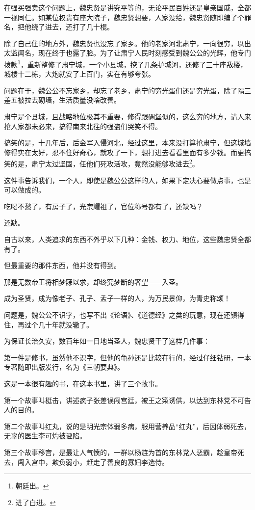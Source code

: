 \begin{multicols}{\theparacolNo}
在强买强卖这个问题上，魏忠贤是讲究平等的，无论平民百姓还是皇亲国戚，全都一视同仁。如某位权贵有座大院子，魏忠贤想要，人家没给，魏忠贤随即编了个罪名，把他绕了进去，还打了几十棍。

除了自己住的地方外，魏忠贤也没忘了家乡。他的老家河北肃宁，一向很穷，以出太监闻名，现在终于也露了脸。为了让肃宁人民时刻感受到魏公公的光辉，他专门拨款\footnote{朝廷出。}，重新整修了肃宁城，一个小县城，挖了几条护城河，还修了三十座敌楼，城楼十二栋，大炮就安了上百门，实在有够夸张。

问题在于，魏公公不忘家乡，却忘了老乡，肃宁的穷光蛋们还是穷光蛋，除了隔三差五被拉去砌墙，生活质量没啥改善。

肃宁是个县城，且战略地位极其不重要，修得跟碉堡似的，这么穷的地方，请人来抢人家都未必来，搞得南来北往的强盗们哭笑不得。

搞笑的是，十几年后，后金军入侵河北，经过这里，本来没打算抢肃宁，但这城墙修得实在太好，忍不住好奇心，就攻了一下，想打进去看看里面有多少钱。而更搞笑的是，肃宁太过坚固，任他们死攻活攻，竟然没能够攻进去\footnote{进了白进。}。

这件事告诉我们，一个人，即使是魏公公这样的人，如果下定决心要做点事，也是可以做成的。

吃喝不愁了，有房子了，光宗耀祖了，官位称号都有了，还缺吗？

还缺。

自古以来，人类追求的东西不外乎以下几种：金钱、权力、地位，这些魏忠贤全都有了。

但最重要的那件东西，他并没有得到。

那是无数帝王将相梦寐以求，却终究梦断的奢望——入圣。

成为圣贤，成为像老子、孔子、孟子一样的人，为万民景仰，为青史称颂！

问题是，魏公公不识字，也写不出《论语》、《道德经》之类的玩意，现在还镇得住，再过个几十年就没辙了。

为保证长治久安，数百年如一日地当圣人，魏忠贤干了这样几件事：

第一件是修书，虽然他不识字，但他的龟孙还是比较在行的，经过仔细钻研，一本专著随即出版发行，名为《三朝要典》。

这是一本很有趣的书，在这本书里，讲了三个故事。

第一个故事叫梃击，讲述疯子张差误闯宫廷，被王之寀诱供，以达到东林党不可告人的目的。

第二个故事叫红丸，说的是明光宗体弱多病，服用营养品“红丸”，后因体弱死去，无辜的医生李可灼被诬陷。

第三个故事移宫，是最让人气愤的，一群以杨涟为首的东林党人恶霸，趁皇帝死去，闯入宫中，欺负弱小，赶走了善良的寡妇李选侍。


\end{multicols}
